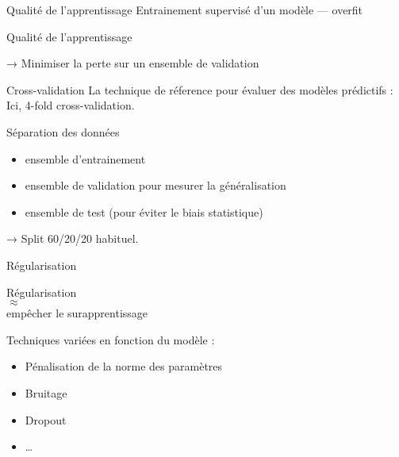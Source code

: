 \begin{frame}{Qualité de l'apprentissage}
  Entrainement supervisé d'un modèle — overfit


\end{frame}

\begin{frame}{Qualité de l'apprentissage}


  → Minimiser la perte sur un ensemble de validation
\end{frame}

\begin{frame}{Cross-validation}
  La technique de réference pour évaluer des modèles prédictifs :
  Ici, 4-fold cross-validation.
\end{frame}

\begin{frame}{Séparation des données}
  \begin{itemize}
  \item ensemble d'entrainement
  \item ensemble de validation pour mesurer la généralisation
  \item ensemble de test (pour éviter le biais statistique)
  \end{itemize}
  → Split 60/20/20 habituel.
\end{frame}

\begin{frame}{Régularisation}
  \begin{minipage}[l]{0.49\linewidth}
    \begin{center}
      Régularisation \\
      $\approx$\\
      empêcher le surapprentissage
    \end{center}
  \end{minipage}\hfill
  \begin{minipage}[l]{0.49\linewidth}
  \end{minipage}\hfill
  Techniques variées en fonction du modèle :
  \begin{itemize}
  \item Pénalisation de la norme des paramètres
  \item Bruitage
  \item Dropout
  \item …
  \end{itemize}
\end{frame}

